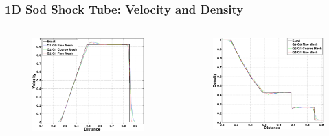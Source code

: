 \documentclass[8pt,xcolor=svgnames]{beamer}
\begin{document}
\begin{frame}
 \frametitle{1D Sod Shock Tube: Velocity and Density}
 \begin{columns}
  \begin{column}{0.4\textwidth}
   \begin{figure}[h!]
    \centering
    \includegraphics[width=1.0\textwidth,keepaspectratio=true]{./Images/SodVelocity_Compare.png}
    \end{figure}
  \end{column}
  \begin{column}{0.4\textwidth}
   \begin{figure}[h!]
    \centering
    \includegraphics[width=1.0\textwidth,keepaspectratio=true]{./Images/SodDensity_Compare.png}

\end{figure}
\end{column}
\end{columns}
\end{frame}
\end{document}
